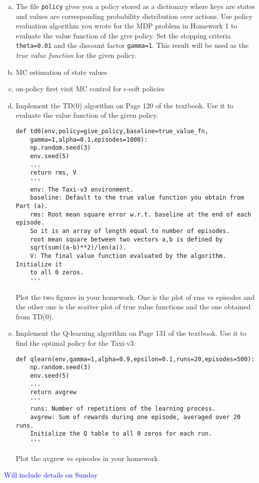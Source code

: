 \begin{enumerate}[(a)]
\item The file \texttt{policy} gives you a policy stored as a dictionary
where keys are states and values are corresponding probability distribution
over actions. Use policy evaluation algorithm you wrote for the MDP problem in
Homework 1 to evaluate the value function of the give policy.
Set the stopping criteria \texttt{theta=0.01} and the discount factor
\texttt{gamma=1}. This result will be used as the \emph{true value function} for
the given policy.
\item MC estimation of state values
\item on-policy first visit MC control for $\epsilon$-soft policies
\item Implement the TD(0) algorithm on Page 120 of the textbook. Use it to
evaluate the value function of the given policy.
\begin{verbatim}
def td0(env,policy=give_policy,baseline=true_value_fn,
    gamma=1,alpha=0.1,episodes=1000):
    np.random.seed(3)
    env.seed(5)
    ...
    return rms, V
    '''
    env: The Taxi-v3 environment.
    baseline: Default to the true value function you obtain from Part (a).
    rms: Root mean square error w.r.t. baseline at the end of each episode.
    So it is an array of length equal to number of episodes.
    root mean square between two vectors a,b is defined by
    sqrt(sum((a-b)**2)/len(a)).
    V: The final value function evaluated by the algorithm. Initialize it
    to all 0 zeros.
    '''
\end{verbatim}
Plot the two figures in your homework. One is the plot of rms vs episodes
and the other one is the scatter plot of true value functions and the one
obtained from TD(0).
\item Implement the Q-learning algorithm on Page 131 of the textbook. Use it
to find the optimal policy for the Taxi-v3.
\begin{verbatim}
def qlearn(env,gamma=1,alpha=0.9,epsilon=0.1,runs=20,episodes=500):
    np.random.seed(3)
    env.seed(5)
    ...
    return avgrew
    '''
    runs: Number of repetitions of the learning process.
    avgrew: Sum of rewards during one episode, averaged over 20 runs.
    Initialize the Q table to all 0 zeros for each run.
    '''
\end{verbatim}
Plot the avgrew vs episodes in your homework.
\end{enumerate}

\textcolor{blue}{Will include details on Sunday}
